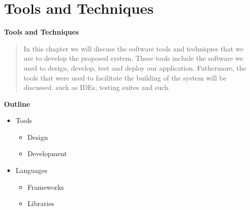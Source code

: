 
\section{Tools and Techniques}

\vspace{20mm}

\Huge{\textbf{Tools and Techniques}}

\vspace{20mm}




\begin{abstract}
    In this chapter we will discuss the software tools and techniques that we use to develop the proposed system. These tools include the software we used to design, develop, test and deploy our application. Futhermore, the tools that were used to facilitate the building of the system will be discussed. such as IDEs, testing suites and such.

\end{abstract}

\vspace{20mm}

\large{\textbf{Outline}}

\begin{center}
    \begin{itemize}
        \item Tools
              \begin{itemize}
                  \item Design
                  \item Development
              \end{itemize}
        \item Languages
              \begin{itemize}
                  \item Frameworks
                  \item Libraries
              \end{itemize}

    \end{itemize}
\end{center}
\pagebreak







